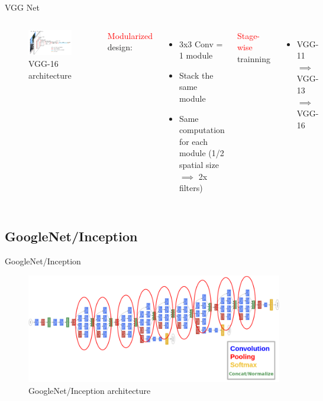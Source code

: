 \documentclass[aspectratio=169]{beamer}
\begin{document}
\begin{frame}{VGG Net}
  \begin{columns}[T,c,onlytextwidth]
\begin{figure}
\includegraphics[scale=0.4]{demo/figs/vgg16.png}
\caption{VGG-16 architecture}
\label{fig:vgg16}
\end{figure}
\textcolor{red}{Modularized} design:
\begin{itemize}
    \item 3x3 Conv = 1 module
    \item Stack the same module
    \item Same computation for each module (1/2 spatial size $\implies$ 2x filters)
\end{itemize}
\textcolor{red}{Stage-wise} trainning
\begin{itemize}
    \item VGG-11 $\implies$ VGG-13 $\implies$ VGG-16
\end{itemize}
\end{columns}
\end{frame}

\subsection{GoogleNet/Inception}
\begin{frame}{GoogleNet/Inception}
\begin{figure}
\includegraphics[scale=0.21]{demo/figs/inception.png}
\caption{GoogleNet/Inception architecture}
\label{fig:inception}
\end{figure}
\end{frame}
\end{document}
